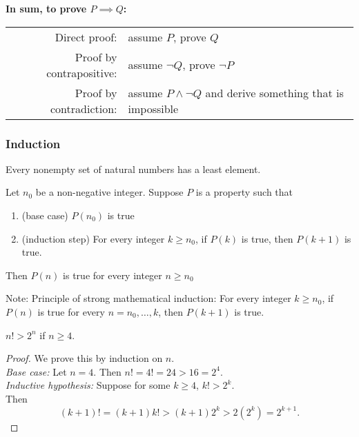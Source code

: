 \documentclass{article}
\begin{document}
{\bf In sum, to prove $P \implies Q$:} \\

\vspace{1em}


\begin{tabular}{r l}
     Direct proof:  & assume $P$, prove $Q$ \\
     Proof by contrapositive:  & assume $\neg Q$, prove $\neg P$ \\ 
     Proof by contradiction: & assume $P \wedge \neg Q$ and derive something that is impossible \\ 
\end{tabular}


\subsubsection{Induction}

\begin{theorem}
Every nonempty set of natural numbers has a least element.
\end{theorem}

\begin{theorem}
Let $n_0$ be a non-negative integer. Suppose $P$ is a property such that 
\begin{enumerate}
\item(base case) $P(n_0)$ is true 
\item (induction step) For every integer $k \geq n_0$, if $P(k)$ is true, then $P(k+1)$ is true.
\end{enumerate}
Then $P(n)$ is true for every integer $n \geq n_0$
\end{theorem}

Note: Principle of strong mathematical induction: For every integer $k \geq n_0$, if $P(n)$ is true for every $n = n_0, \ldots, k$, then $P(k+1)$ is true.


\begin{example}
$n! > 2^n$ if $n \geq 4$.
\end{example}


\begin{proof}
We prove this by induction on $n$. \\
{\it Base case:} Let $n = 4$. Then $n! = 4! = 24 > 16 = 2^4$. \\
{\it Inductive hypothesis:} Suppose for some $k \geq 4$, $k! > 2^k$. \\
Then
$$(k+1)! = (k+1) k! > (k+1) 2^k > 2 (2^k) = 2^{k+1}.$$
\end{proof}
\end{document}
